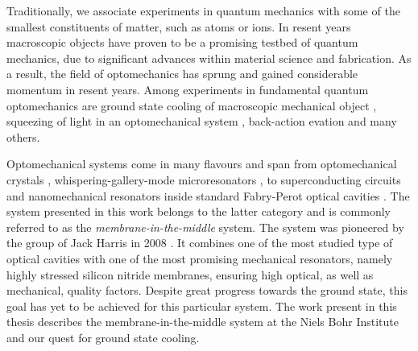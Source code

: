 Traditionally, we associate experiments in quantum mechanics with some of the smallest constituents of matter, such as atoms or ions. In resent years macroscopic objects have proven to be a promising testbed of quantum mechanics, due to significant advances within material science and fabrication. As a result, the field of optomechanics has sprung and gained considerable momentum in resent years. Among experiments in fundamental quantum optomechanics are ground state cooling of macroscopic mechanical object \cite{oconnell2010, chan2011, teufel2011}, squeezing of light in an optomechanical system \cite{purdy2013, safavi2013}, back-action evation \cite{suh2014} and many others.

Optomechanical systems come in many flavours and span from optomechanical crystals \cite{chan2011}, whispering-gallery-mode microresonators \cite{schliesser2009}, to superconducting circuits \cite{teufel2011, oconnell2010, suh2014} and nanomechanical resonators inside standard Fabry-Perot optical cavities \cite{jayich2008}. The system presented in this work belongs to the latter category and is commonly referred to as the {\it{membrane-in-the-middle}} system. The system was pioneered by the group of Jack Harris in 2008 \cite{jayich2008}. It combines one of the most studied type of optical cavities with one of the most promising mechanical resonators, namely highly stressed silicon nitride membranes, ensuring high optical, as well as mechanical, quality factors. Despite great progress towards the ground state, this goal has yet to be achieved for this particular system. The work present in this thesis describes the membrane-in-the-middle system at the Niels Bohr Institute and our quest for ground state cooling.